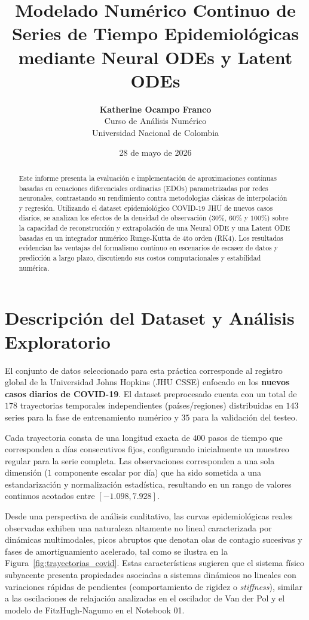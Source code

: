 \documentclass[11pt,a4paper]{article}
\title{\textbf{Modelado Numérico Continuo de Series de Tiempo Epidemiológicas mediante Neural ODEs y Latent ODEs}}
\author{\textbf{Katherine Ocampo Franco} \\ \small Curso de Análisis Numérico \\ \small Universidad Nacional de Colombia}
\date{28 de mayo de 2026}
\begin{document}
\maketitle

\begin{abstract}
Este informe presenta la evaluación e implementación de aproximaciones continuas basadas en ecuaciones diferenciales ordinarias (EDOs) parametrizadas por redes neuronales, contrastando su rendimiento contra metodologías clásicas de interpolación y regresión. Utilizando el dataset epidemiológico COVID-19 JHU de nuevos casos diarios, se analizan los efectos de la densidad de observación ($30\%$, $60\%$ y $100\%$) sobre la capacidad de reconstrucción y extrapolación de una Neural ODE y una Latent ODE basadas en un integrador numérico Runge-Kutta de 4to orden (RK4). Los resultados evidencian las ventajas del formalismo continuo en escenarios de escasez de datos y predicción a largo plazo, discutiendo sus costos computacionales y estabilidad numérica.
\end{abstract}

\section{Descripción del Dataset y Análisis Exploratorio}
El conjunto de datos seleccionado para esta práctica corresponde al registro global de la Universidad Johns Hopkins (JHU CSSE) enfocado en los \textbf{nuevos casos diarios de COVID-19}. El dataset preprocesado cuenta con un total de $178$ trayectorias temporales independientes (países/regiones) distribuidas en $143$ series para la fase de entrenamiento numérico y $35$ para la validación del testeo. 

Cada trayectoria consta de una longitud exacta de $400$ pasos de tiempo que corresponden a días consecutivos fijos, configurando inicialmente un muestreo regular para la serie completa. Las observaciones corresponden a una sola dimensión ($1$ componente escalar por día) que ha sido sometida a una estandarización y normalización estadística, resultando en un rango de valores continuos acotados entre $[-1.098, 7.928]$. 

Desde una perspectiva de análisis cualitativo, las curvas epidemiológicas reales observadas exhiben una naturaleza altamente no lineal caracterizada por dinámicas multimodales, picos abruptos que denotan olas de contagio sucesivas y fases de amortiguamiento acelerado, tal como se ilustra en la Figura~\ref{fig:trayectorias_covid}. Estas características sugieren que el sistema físico subyacente presenta propiedades asociadas a sistemas dinámicos no lineales con variaciones rápidas de pendientes (comportamiento de rigidez o \textit{stiffness}), similar a las oscilaciones de relajación analizadas en el oscilador de Van der Pol y el modelo de FitzHugh-Nagumo en el Notebook 01.
\end{document}
